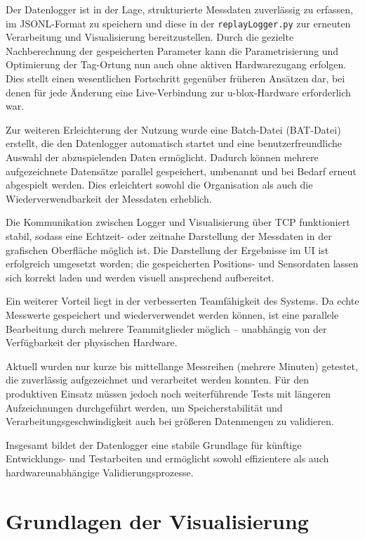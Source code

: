\documentclass[a4paper, 12pt]{article} %
\begin{document}
Der Datenlogger ist in der Lage, strukturierte Messdaten zuverlässig zu erfassen, im JSONL-Format zu speichern und diese in der 
\texttt{replayLogger.py} zur erneuten Verarbeitung und Visualisierung bereitzustellen. Durch die gezielte Nachberechnung der gespeicherten 
Parameter kann die Parametrisierung und Optimierung der Tag-Ortung nun auch ohne aktiven Hardwarezugang erfolgen. Dies stellt einen wesentlichen
 Fortschritt gegenüber früheren Ansätzen dar, bei denen für jede Änderung eine Live-Verbindung zur u-blox-Hardware erforderlich war.

Zur weiteren Erleichterung der Nutzung wurde eine Batch-Datei (BAT-Datei) erstellt, die den Datenlogger automatisch 
startet und eine benutzerfreundliche Auswahl der abzuspielenden Daten ermöglicht. Dadurch können mehrere aufgezeichnete Datensätze
 parallel gespeichert, umbenannt und bei Bedarf erneut abgespielt werden. Dies erleichtert sowohl die Organisation als auch die Wiederverwendbarkeit
  der Messdaten erheblich.

Die Kommunikation zwischen Logger und Visualisierung über TCP funktioniert stabil, sodass eine Echtzeit- oder zeitnahe Darstellung 
der Messdaten in der grafischen Oberfläche möglich ist. Die Darstellung der Ergebnisse im UI ist erfolgreich umgesetzt worden; die gespeicherten
 Positions- und Sensordaten lassen sich korrekt laden und werden visuell ansprechend aufbereitet.

Ein weiterer Vorteil liegt in der verbesserten Teamfähigkeit des Systems. Da echte Messwerte gespeichert und wiederverwendet werden können, 
ist eine parallele Bearbeitung durch mehrere Teammitglieder möglich – unabhängig von der Verfügbarkeit der physischen Hardware.

Aktuell wurden nur kurze bis mittellange Messreihen (mehrere Minuten) getestet, die zuverlässig aufgezeichnet und verarbeitet werden konnten. 
Für den produktiven Einsatz müssen jedoch noch weiterführende Tests mit längeren Aufzeichnungen durchgeführt werden, um Speicherstabilität und 
Verarbeitungsgeschwindigkeit auch bei größeren Datenmengen zu validieren.

Insgesamt bildet der Datenlogger eine stabile Grundlage für künftige Entwicklungs- und Testarbeiten und ermöglicht sowohl effizientere als auch 
hardwareunabhängige Validierungsprozesse.


\clearpage

\section{Grundlagen der Visualisierung}
\end{document}
